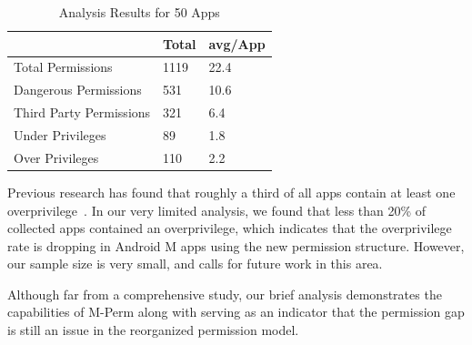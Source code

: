 \documentclass{sig-alternate-05-2015}
\newcommand{\todo}[1]{\textcolor{cyan}{\textbf{[#1]}}}
\begin{document}


\begin{table}[ht]%
\begin{center}
\caption{Analysis Results for 50 Apps}
\label{Table:appAnalysisResults}
  \begin{tabular}{ l | l  | l }

    \bfseries  & \bfseries Total & \bfseries avg/App \\ \hline
    Total Permissions & 1119 & 22.4  \\ \hline
    Dangerous Permissions & 531  & 10.6 \\ \hline
    Third Party Permissions& 321 & 6.4 \\ \hline
    Under Privileges & 89 & 1.8 \\ \hline
    Over Privileges & 110 & 2.2 \\

  \end{tabular}
  \end{center}
\end{table}



Previous research has found that roughly a third of all apps contain at least one overprivilege~\cite{Felt:2011:APD:2046707.2046779}. In our very limited analysis, we found that less than 20\% of collected apps contained an overprivilege, which indicates that the overprivilege rate is dropping in Android M apps using the new permission structure. However, our sample size is very small, and calls for future work in this area.

Although far from a comprehensive study, our brief analysis demonstrates the capabilities of M-Perm along with serving as an indicator that the permission gap is still an issue in the reorganized permission model.









\end{document}
